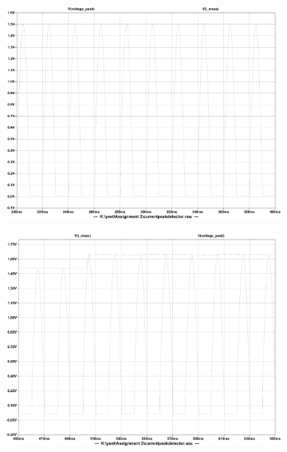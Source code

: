 \begin{figure} [!ht]
 \footnotesize
 \centering
    \begin{subfigure}[]{0.4\textwidth}
              \centering
  		\includegraphics[width=1\linewidth]{./Figures/itrans_simu_nomload.pdf}
		    \caption{} \label{subfig:itrans_simu_nomload}
     \end{subfigure}
          \begin{subfigure}[]{0.4\textwidth}
             \centering
  		\includegraphics[width=1.0\linewidth]{./Figures/itrans_simu_change.pdf}
		   \caption{ } \label{subfig:itrans_simu_change}
     \end{subfigure}
    \begin{subfigure}[]{0.4\textwidth}

\end{subfigure}
\end{figure}
